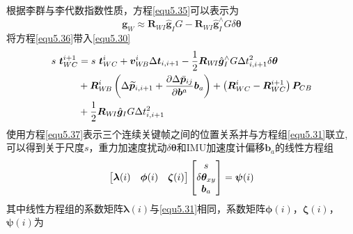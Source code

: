 根据李群与李代数指数性质，方程\eqref{equ5.35}可以表示为
\begin{equation}
\label{equ5.36}
\boldsymbol{g}_W \approx \boldsymbol{R}_{W\!I} \hat{\boldsymbol{g}}_I G - \boldsymbol{R}_{W\!I} \hat{\boldsymbol{g}}_I^{\wedge}G\delta \boldsymbol{\theta} 
\end{equation}
将方程\eqref{equ5.36}带入\eqref{equ5.30}
\begin{equation}
\label{equ5.37}
\begin{aligned}
s \ \boldsymbol{t}_{WC}^{i+1} &= s \ \boldsymbol{t}_{WC}^i +  \boldsymbol{v}_{W\!B}^i \Delta \boldsymbol{t}_{i,i+1} 
- { 1 \over 2} \boldsymbol{R}_{W\!I} \hat{\boldsymbol{g}}_I^{\wedge}G \Delta t_{i,i+1}^2  \delta \boldsymbol{\theta} 
\\
& + \boldsymbol{R}_{W\!B}^i \left( \Delta \widetilde{\boldsymbol{p}}_{i,i+1} + {\partial \Delta \bar{\boldsymbol{p}}_{ij} \over \partial \boldsymbol{b}^a } \boldsymbol{b}_a  \right) +\left( \boldsymbol{R}_{WC}^i - \boldsymbol{R}_{WC}^{i+1} \right) \boldsymbol{P}_{CB} 
\\
& + {1 \over 2} \boldsymbol{R}_{W\!I} \hat{\boldsymbol{g}}_I G \Delta t_{i,i+1}^2
\end{aligned}
\end{equation}
使用方程\eqref{equ5.37}表示三个连续关键帧之间的位置关系并与方程组\eqref{equ5.31}联立,可以得到关于尺度$s$，重力加速度扰动$\delta \boldsymbol{\theta}$和IMU加速度计偏移$\boldsymbol{b}_a$的线性方程组
\begin{equation}
\label{equ5.38}
\begin{bmatrix}
\boldsymbol{\lambda} (i) & \boldsymbol{\phi} (i) & \boldsymbol{\zeta}  (i) \cr
\end{bmatrix}
\begin{bmatrix}
s \cr \delta \boldsymbol{\theta}_{xy} \cr \boldsymbol{b}_a \cr
\end{bmatrix}
= \boldsymbol{\psi} (i)
\end{equation}
其中线性方程组的系数矩阵$\boldsymbol{\lambda} (i)$与\eqref{equ5.31}相同，系数矩阵$\boldsymbol{\phi}(i)$，$\boldsymbol{\zeta}(i)$，$\boldsymbol{\psi}(i)$为
